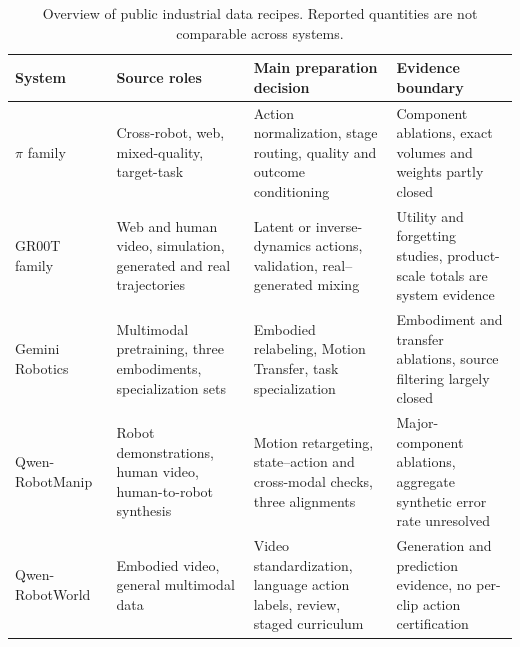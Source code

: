 \begin{table}[t]
\centering
\caption{Overview of public industrial data recipes. Reported quantities are not comparable across systems.}
\label{tab:industrial-recipes}
\scriptsize
\setlength{\tabcolsep}{4pt}
\renewcommand{\arraystretch}{1.08}
\begin{tabularx}{\textwidth}{@{}p{3.0cm}p{4.0cm}p{5.1cm}X@{}}
\toprule
System & Source roles & Main preparation decision & Evidence boundary \\
\midrule
$\pi$ family~\cite{intelligence20250_2504_16054,intelligence20260_2604_15483,intelligence20250_2511_14759}
& Cross-robot, web, mixed-quality, target-task
& Action normalization, stage routing, quality and outcome conditioning
& Component ablations, exact volumes and weights partly closed \\
GR00T family~\cite{nvidia2025gr00t_2503_14734,jang2025dreamgen_2505_12705,nvidia2026gr00t17}
& Web and human video, simulation, generated and real trajectories
& Latent or inverse-dynamics actions, validation, real--generated mixing
& Utility and forgetting studies, product-scale totals are system evidence \\
Gemini Robotics~\cite{team2025gemini_2503_20020,team2025gemini_2510_03342}
& Multimodal pretraining, three embodiments, specialization sets
& Embodied relabeling, Motion Transfer, task specialization
& Embodiment and transfer ablations, source filtering largely closed \\
Qwen-RobotManip~\cite{yuan2026qwen_2606_17846}
& Robot demonstrations, human video, human-to-robot synthesis
& Motion retargeting, state--action and cross-modal checks, three alignments
& Major-component ablations, aggregate synthetic error rate unresolved \\
Qwen-RobotWorld~\cite{zhang2026qwen_2606_17030}
& Embodied video, general multimodal data
& Video standardization, language action labels, review, staged curriculum
& Generation and prediction evidence, no per-clip action certification \\
\bottomrule
\end{tabularx}
\end{table}
